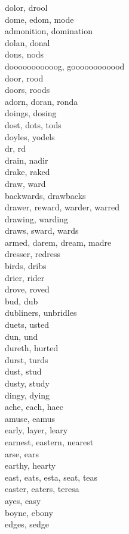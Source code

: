 dolor, drool\\
dome, edom, mode\\
admonition, domination\\
dolan, donal\\
dons, nods\\
dooooooooooog, goooooooooood\\
door, rood\\
doors, roods\\
adorn, doran, ronda\\
doings, dosing\\
dost, dots, tods\\
doyles, yodels\\
dr, rd\\
drain, nadir\\
drake, raked\\
draw, ward\\
backwards, drawbacks\\
drawer, reward, warder, warred\\
drawing, warding\\
draws, sward, wards\\
armed, darem, dream, madre\\
dresser, redress\\
birds, dribs\\
drier, rider\\
drove, roved\\
bud, dub\\
dubliners, unbridles\\
duets, usted\\
dun, und\\
dureth, hurted\\
durst, turds\\
dust, stud\\
dusty, study\\
dingy, dying\\
ache, each, haec\\
amuse, eamus\\
early, layer, leary\\
earnest, eastern, nearest\\
arse, ears\\
earthy, hearty\\
east, eats, esta, seat, teas\\
easter, eaters, teresa\\
ayes, easy\\
boyne, ebony\\
edges, sedge\\
